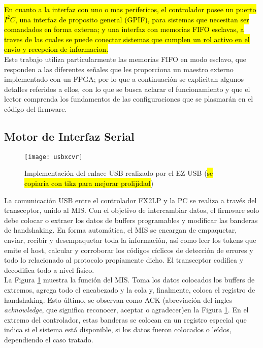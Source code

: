 \hl{En cuanto a la interfaz con uno o mas perifericos, el controlador posee un puerto $I^2C$, una interfaz de proposito general (GPIF), para sistemas que necesitan ser comandados en forma externa; y una interfaz con memorias FIFO esclavas, a traves de las cuales se puede conectar sistemas que cumplen un rol activo en el envio y recepcion de informacion.}\\

Este trabajo utiliza particularmente las memorias FIFO en modo esclavo, que responden a las diferentes señales que les proporciona un maestro externo implementado con un FPGA; por lo que a continuación se explicitan algunos detalles referidos a ellos, con lo que se busca aclarar el funcionamiento y que el lector comprenda los fundamentos de las configuraciones que se plasmarán en el código del firmware.\\

\subsection{Motor de Interfaz Serial}

	\begin{figure}[ht]%
		\centering
		\texttt{[image: usbxcvr]}
		\caption{Implementación del enlace USB realizado por el EZ-USB (\hl{se copiaria con tikz para mejorar prolijidad})}
		\label{usbxcvr}
	\end{figure}
	
	La comunicación USB entre el controlador FX2LP y la PC se realiza a través del transceptor, unido al MIS. Con el objetivo de intercambiar datos, el firmware solo debe colocar o extraer los datos de buffers programables y modificar las banderas de handshaking. En forma automática, el MIS se encargan de empaquetar, enviar, recibir y desempaquetar toda la información, así como leer los tokens que emite el host, calcular y corroborar los códigos cíclicos de detección de errores y todo lo relacionado al protocolo propiamente dicho. El transceptor codifica y decodifica todo a nivel físico.\\
	
	La Figura \ref{usbxcvr} muestra la función del MIS. Toma los datos colocados los buffers de extremos, agrega todo el encabezado y la cola y, finalmente, coloca el registro de handshaking. Esto último, se observan como ACK (abreviación del ingles {\it acknowledge}, que significa reconocer, aceptar o agradecer)en la Figura \ref{usbxcvr}. En el extremo del controlador, estas banderas se colocan en un registro especial que indica si el sistema está disponible, si los datos fueron colocados o leídos, dependiendo el caso tratado. \\
		
